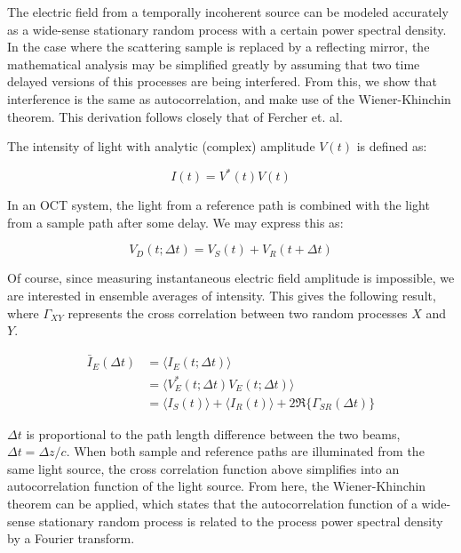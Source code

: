 The electric field from a temporally incoherent source can be modeled accurately as a wide-sense stationary random process with a certain power spectral density. \cite{Bouma} In the case where the scattering sample is replaced by a reflecting mirror, the mathematical analysis may be simplified greatly by assuming that two time delayed versions of this processes are being interfered. From this, we show that interference is the same as autocorrelation, and make use of the Wiener-Khinchin theorem. This derivation follows closely that of Fercher et. al. \cite{fercher}

The intensity of light with analytic (complex) amplitude $V(t)$ is defined as:

\begin{equation}
I(t) = V^*(t)V(t)
\end{equation}

In an OCT system, the light from a reference path is combined with the light from a sample path after some delay. We may express this as:

\begin{equation}
V_D(t; \Delta t) = V_S(t) + V_R(t + \Delta t)
\end{equation}

Of course, since measuring instantaneous electric field amplitude is impossible, we are interested in ensemble averages of intensity. This gives the following result, where $\Gamma_{XY}$ represents the cross correlation between two random processes $X$ and $Y$.

\begin{equation}
\begin{aligned}
\bar{I}_E(\Delta t) & =  \langle I_E(t; \Delta t) \rangle \\
& =  \langle V^*_E(t; \Delta t) V_E(t; \Delta t) \rangle \\
& =  \langle I_S(t) \rangle + \langle I_R(t) \rangle + 2 \Re \{\Gamma_{SR} (\Delta t) \}
\end{aligned}
\end{equation}

$\Delta t$ is proportional to the path length difference between the two beams, $\Delta t = \Delta z / c$. When both sample and reference paths are illuminated from the same light source, the cross correlation function above simplifies into an autocorrelation function of the light source. From here, the Wiener-Khinchin theorem can be applied, which states that the autocorrelation function of a wide-sense stationary random process is related to the process power spectral density by a Fourier transform.

